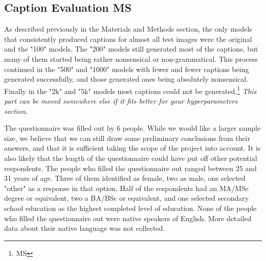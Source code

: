 \documentclass[11pt]{article}
\begin{document}
\subsection{Caption Evaluation \textbf{MS}}

As described previously in the Materials and Methods section, the only models that consistently produced captions for almost all test images were the original and the "100" models. The "200" models still generated most of the captions, but many of them started being rather nonsensical or non-grammatical. This process continued in the "500" and "1000" models with fewer and fewer captions being generated successfully, and those generated ones being absolutely nonsensical. Finally in the "2k" and "5k" models most captions could not be generated.\footnote{MS} \textit{This part can be moved somewhere else if it fits better for your hyperparameters section.}

The questionnaire was filled out by 6 people. While we would like a larger sample size, we believe that we can still draw some preliminary conclusions from their answers, and that it is sufficient taking the scope of the project into account. It is also likely that the length of the questionnaire could have put off other potential respondents. The people who filled the questionnaire out ranged between 25 and 31 years of age. Three of them identified as female, two as male, one selected "other" as a response in that option. Half of the respondents had an MA/MSc degree or equivalent, two a BA/BSc or equivalent, and one selected secondary school education as the highest completed level of education. None of the people who filled the questionnaire out were native speakers of English. More detailed data about their native language was not collected. 
\end{document}
